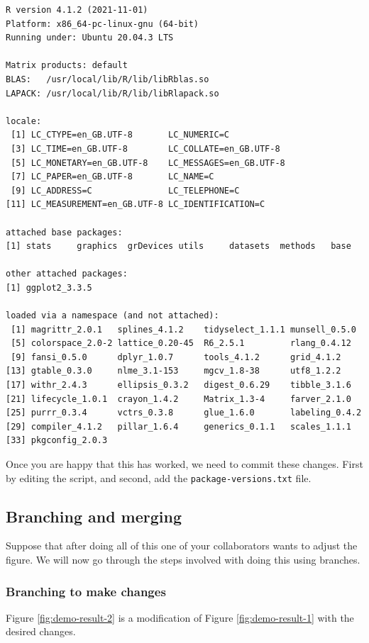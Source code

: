 \documentclass[11pt,onecolumn]{scrartcl}
\begin{document}
\begin{verbatim}
R version 4.1.2 (2021-11-01)
Platform: x86_64-pc-linux-gnu (64-bit)
Running under: Ubuntu 20.04.3 LTS

Matrix products: default
BLAS:   /usr/local/lib/R/lib/libRblas.so
LAPACK: /usr/local/lib/R/lib/libRlapack.so

locale:
 [1] LC_CTYPE=en_GB.UTF-8       LC_NUMERIC=C
 [3] LC_TIME=en_GB.UTF-8        LC_COLLATE=en_GB.UTF-8
 [5] LC_MONETARY=en_GB.UTF-8    LC_MESSAGES=en_GB.UTF-8
 [7] LC_PAPER=en_GB.UTF-8       LC_NAME=C
 [9] LC_ADDRESS=C               LC_TELEPHONE=C
[11] LC_MEASUREMENT=en_GB.UTF-8 LC_IDENTIFICATION=C

attached base packages:
[1] stats     graphics  grDevices utils     datasets  methods   base

other attached packages:
[1] ggplot2_3.3.5

loaded via a namespace (and not attached):
 [1] magrittr_2.0.1   splines_4.1.2    tidyselect_1.1.1 munsell_0.5.0
 [5] colorspace_2.0-2 lattice_0.20-45  R6_2.5.1         rlang_0.4.12
 [9] fansi_0.5.0      dplyr_1.0.7      tools_4.1.2      grid_4.1.2
[13] gtable_0.3.0     nlme_3.1-153     mgcv_1.8-38      utf8_1.2.2
[17] withr_2.4.3      ellipsis_0.3.2   digest_0.6.29    tibble_3.1.6
[21] lifecycle_1.0.1  crayon_1.4.2     Matrix_1.3-4     farver_2.1.0
[25] purrr_0.3.4      vctrs_0.3.8      glue_1.6.0       labeling_0.4.2
[29] compiler_4.1.2   pillar_1.6.4     generics_0.1.1   scales_1.1.1
[33] pkgconfig_2.0.3
\end{verbatim}

Once you are happy that this has worked, we need to commit these changes. First
by editing the script, and second, add the \texttt{package-versions.txt} file.

\subsection{Branching and merging}
\label{sec:org3488b09}

Suppose that after doing all of this one of your collaborators wants to adjust
the figure. We will now go through the steps involved with doing this using
branches.

\subsubsection*{Branching to make changes}
\label{sec:org927d6f4}

Figure \ref{fig:demo-result-2} is a modification of Figure \ref{fig:demo-result-1} with the
desired changes.
\end{document}
